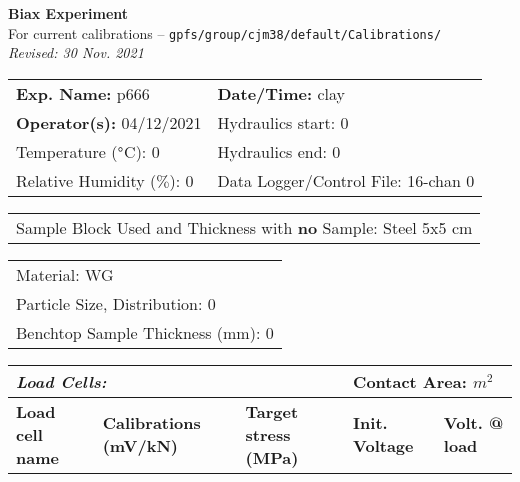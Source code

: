 \documentclass[letterpaper, 10pt]{article}
\begin{document}
\begin{center}
    {\Large \textbf{Biax Experiment}}\\
    {\small For current calibrations -- \texttt{gpfs/group/cjm38/default/Calibrations/}}\\
    {\footnotesize \textit{Revised: 30 Nov. 2021}}
\end{center}



\begin{table}[!ht]
	\renewcommand{\arraystretch}{1.1}
	\begin{tabular}{p{10cm} p{10cm} }
	    \textbf{Exp. Name: }p666 & \textbf{Date/Time: }clay\\
	    \textbf{Operator(s): }04/12/2021 & Hydraulics start: 0 \\
	    Temperature ($\degree$C): 0 & Hydraulics end: 0 \\
	    Relative Humidity ($\%$): 0 & Data Logger/Control File: 16-chan 0\\
	\end{tabular}
\end{table} 
\vspace{-0.5cm} 

\begin{table}[!ht]
	\renewcommand{\arraystretch}{1.1}
	\begin{tabular}{p{20cm}}Sample Block Used and Thickness with \textbf{no} Sample: Steel 5x5 cm \\
	\end{tabular}
    \end{table} \vspace{-0.5cm} 

\begin{table}[!ht]
        \small
        \renewcommand{\arraystretch}{1.2}
        \begin{tabular}{ |p{7cm}| } \hline 
Material: WG \\Particle Size, Distribution: 0 \\Benchtop Sample Thickness (mm): 0 \\\end{tabular} \end{table} \vspace{-0.5cm} 

\begin{table}[ht!]
        \renewcommand{\arraystretch}{1.5}
        \begin{tabular}{ |p{2.75cm}|p{4cm}|p{3.5cm}|p{2.5cm}| p{3cm}| }
            \multicolumn{3}{l}{\textbf{\textit{Load Cells:}}} & \multicolumn{2}{l}{Contact Area:  $ m^2 $}\\ \hline
            \textbf{Load cell name} & \textbf{Calibrations (mV/kN)} & \textbf{Target stress (MPa)} & \textbf{Init. Voltage} & \textbf{Volt. @ load}\\
            \hline
            


    \end{tabular}
    \end{table} \vspace{-0.5cm} 
\end{document}
